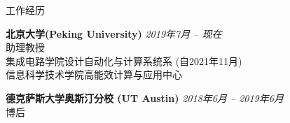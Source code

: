 
\begin{rSection}{工作经历}

{\bf 北京大学(Peking University)}                           \hfill {\em 2019年7月 -- 现在} \\
助理教授 \\
集成电路学院设计自动化与计算系统系 (自2021年11月) \\
信息科学技术学院高能效计算与应用中心

{\bf 德克萨斯大学奥斯汀分校 (UT Austin)}                           \hfill {\em 2018年6月 -- 2019年6月} \\
博后

%
%
%
%


\end{rSection}


